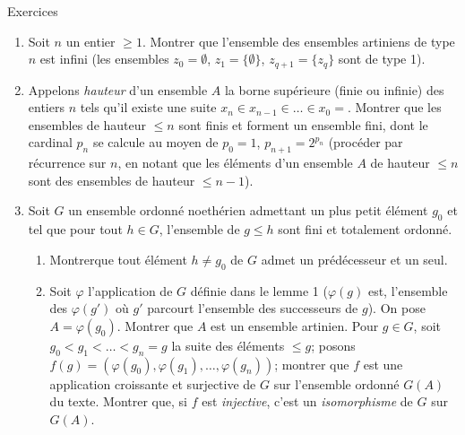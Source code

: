 \begin{enonce*}[remark]{Exercices}
\begin{enumerate}
\renewcommand{\labelenumi}{\theenumi)}
\item Soit $n$ un entier $\geq 1$. Montrer que l'ensemble des ensembles
artiniens de type $n$ est infini (les ensembles $z_0=∅$,
$z_1=\{∅\}$, $z_{q+1}=\{z_q\}$ sont de type 1).

\item Appelons \emph{hauteur} d'un ensemble $A$ la borne supérieure
(finie ou infinie) des entiers $n$ tels qu'il existe une suite
$x_n\in x_{n-1}\in \ldots \in x_0=$. Montrer que les ensembles de
hauteur $\leq n$ sont finis et forment un ensemble fini, dont le
cardinal $p_n$ se calcule au moyen de $p_0=1$, $p_{n+1}=2^{p_n}$
(procéder par récurrence sur $n$, en notant que les éléments d'un
ensemble $A$ de hauteur $\leq n$ sont des ensembles de hauteur $\leq
n-1$).

\item Soit $G$ un ensemble ordonné noethérien admettant un plus
petit élément $g_0$ et tel que pour tout $h\in G$, l'ensemble de
$g\leq h$ sont fini et totalement ordonné.
\begin{enumerate}
\renewcommand{\theenumii}{\alph{enumii}}
\renewcommand{\labelenumii}{\theenumii)}
\item Montrer\pageoriginale que tout élément $h\neq g_0$ de $G$
admet un prédécesseur et un seul.

\item Soit $\varphi$ l'application de $G$ définie dans le lemme 1
(\ie $\varphi(g)$ est, l'ensemble des $\varphi(g')$ où $g'$ parcourt
l'ensemble des successeurs de $g$). On pose $A=\varphi(g_0)$.
Montrer que $A$ est un ensemble artinien. Pour $g\in G$, soit
$g_0<g_1<\ldots<g_n=g$ la suite des éléments $\leq g$; posons
$f(g)=(\varphi(g_0),\varphi(g_1),\ldots,\varphi(g_n))$; montrer que
$f$ est une application croissante et surjective de $G$ sur
l'ensemble ordonné $G(A)$ du texte. Montrer que, si $f$ est
\emph{injective}, c'est un \emph{isomorphisme} de $G$ sur $G(A)$.


\end{enumerate}
\end{enumerate}
\end{enonce*}
